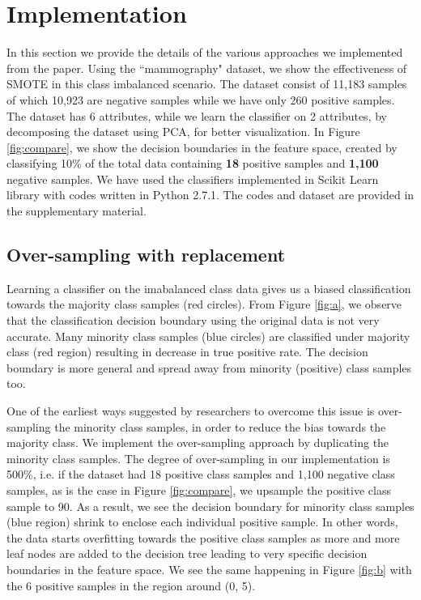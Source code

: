 \documentclass[10pt,journal,compsoc]{IEEEtran}
\begin{document}
\section{Implementation}
\label{sec:implement}
In this section we provide the details of the various approaches we implemented from the paper.
Using the ``mammography" dataset\cite{mammo}, we show the effectiveness of SMOTE in this class imbalanced scenario.
The dataset consist of 11,183 samples of which 10,923 are negative samples while we have only 260 positive samples.
The dataset has 6 attributes, while we learn the classifier on 2 attributes, by decomposing the dataset using PCA, for better visualization. 
In Figure \ref{fig:compare}, we show the decision boundaries in the feature space, created by classifying 10\% of the total data containing \textbf{18} positive samples and \textbf{1,100} negative samples.
We have used the classifiers implemented in Scikit Learn library\cite{sklearn} with codes written in Python 2.7.1.
The codes and dataset are provided in the supplementary material.

\subsection{Over-sampling with replacement}
Learning a classifier on the imabalanced class data gives us a biased classification towards the majority class samples (red circles).
From Figure \ref{fig:a}, we observe that the classification decision boundary using the original data is not very accurate. 
Many minority class samples (blue circles) are classified under majority class (red region) resulting in decrease in true positive rate. 
The decision boundary is more general and spread away from minority (positive) class samples too.

One of the earliest ways suggested by researchers to overcome this issue is over-sampling the minority class samples, in order to reduce the bias towards the majority class.
We implement the over-sampling approach by duplicating the minority class samples.
The degree of over-sampling in our implementation is 500\%, i.e. if the dataset had 18 positive class samples and 1,100 negative class samples, as is the case in Figure \ref{fig:compare}, we upsample the positive class sample to 90.
As a result, we see the decision boundary for minority class samples (blue region) shrink to enclose each individual positive sample.
In other words, the data starts overfitting towards the positive class samples as more and more leaf nodes are added to the decision tree leading to very specific decision boundaries in the feature space.
We see the same happening in Figure \ref{fig:b} with the 6 positive samples in the region around (0, 5).
\end{document}
